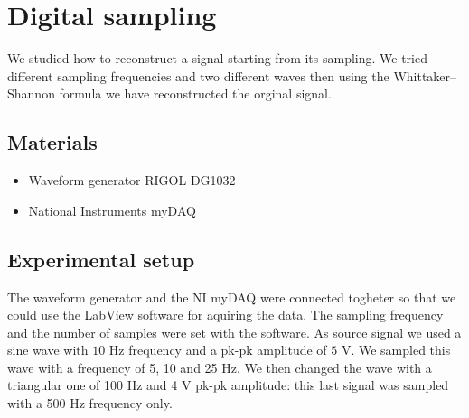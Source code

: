 \chapter{Digital sampling}
We studied how to reconstruct a signal starting from its sampling. We tried different sampling frequencies and two different waves then using the Whittaker–Shannon formula we have reconstructed the orginal signal. 

\section{Materials}
\begin{itemize}
\item Waveform generator RIGOL DG1032
\item National Instruments myDAQ
\end{itemize}
\section{Experimental setup}
The waveform generator and the NI myDAQ were connected togheter so that we could use the LabView software for aquiring the data. The sampling frequency and the number of samples were set with the software. As source signal we used a sine wave with $10$ Hz frequency and a pk-pk amplitude of $5$ V. We sampled this wave with a frequency of 5, 10 and 25 Hz. We then changed the wave with a triangular one of 100 Hz and 4 V pk-pk amplitude: this last signal was sampled with a 500 Hz frequency only.

